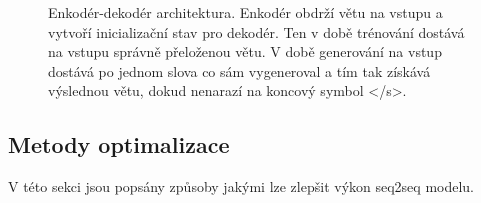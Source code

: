 \begin{figure}[h]
    \begin{center}
    \end{center}
	\caption{Enkodér-dekodér architektura. Enkodér obdrží větu na vstupu a vytvoří inicializační stav pro dekodér. Ten v době trénování dostává na vstupu správně přeloženou větu. V době generování na vstup dostává po jednom slova co sám vygeneroval a tím tak získává výslednou větu, dokud nenarazí na koncový symbol </s>. }
	\label{img:seq2seq}
\end{figure}


\subsection{Metody optimalizace} \label{subsection:optimization} V této sekci jsou popsány způsoby jakými lze zlepšit výkon seq2seq modelu.

